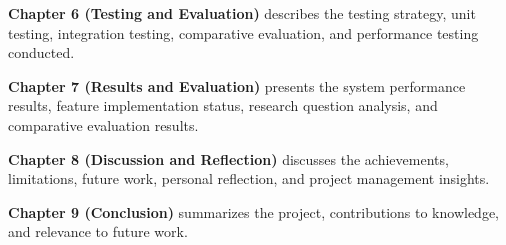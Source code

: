 \documentclass[12pt,a4paper]{report}
\begin{document}
\textbf{Chapter 6 (Testing and Evaluation)} describes the testing strategy, unit testing, integration testing, comparative evaluation, and performance testing conducted.

\textbf{Chapter 7 (Results and Evaluation)} presents the system performance results, feature implementation status, research question analysis, and comparative evaluation results.

\textbf{Chapter 8 (Discussion and Reflection)} discusses the achievements, limitations, future work, personal reflection, and project management insights.

\textbf{Chapter 9 (Conclusion)} summarizes the project, contributions to knowledge, and relevance to future work.




\end{document}
